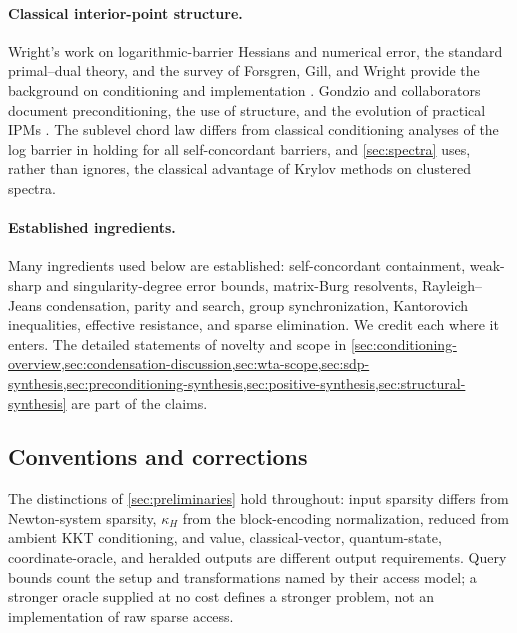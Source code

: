 \paragraph{Classical interior-point structure.}
Wright's work on logarithmic-barrier Hessians and numerical error, the
standard primal--dual theory, and the survey of Forsgren, Gill, and Wright
provide the background on conditioning and implementation
\cite{wright1994-properties-hessian-logarithmic-barrier,
wright1998-ill-conditioning-computational-error-interior,
wright1997-primal-dual-interior-point-methods,
forsgren2002-interior-methods-nonlinear-optimization}.  Gondzio and
collaborators document preconditioning, the use of structure, and the
evolution of practical IPMs
\cite{jacek2012-interior-point-methods-25-years,
gondzio2023-general-purpose-preconditioning-regularized-interior-point}.
The sublevel chord law differs from
classical conditioning analyses of the log barrier in holding for all
self-concordant barriers, and \cref{sec:spectra} uses, rather than ignores,
the classical advantage of Krylov methods on clustered spectra.

\paragraph{Established ingredients.}
Many ingredients used below are established: self-concordant containment,
weak-sharp and singularity-degree error bounds, matrix-Burg resolvents,
Rayleigh--Jeans condensation, parity and search, group synchronization,
Kantorovich inequalities, effective resistance, and sparse elimination.  We
credit each where it enters.  The detailed statements of novelty and scope in
\cref{sec:conditioning-overview,sec:condensation-discussion,sec:wta-scope,sec:sdp-synthesis,sec:preconditioning-synthesis,sec:positive-synthesis,sec:structural-synthesis}
are part of the claims.

\subsection{Conventions and corrections}
\label{sec:introduction-verification}

The distinctions of \cref{sec:preliminaries} hold throughout: input sparsity
differs from Newton-system sparsity, \(\kappa_H\) from the block-encoding
normalization, reduced from ambient KKT conditioning, and value,
classical-vector, quantum-state, coordinate-oracle, and heralded outputs are
different output requirements.  Query bounds count the setup and
transformations named by their access model; a stronger oracle supplied at
no cost defines a stronger problem, not an implementation of raw sparse
access.

